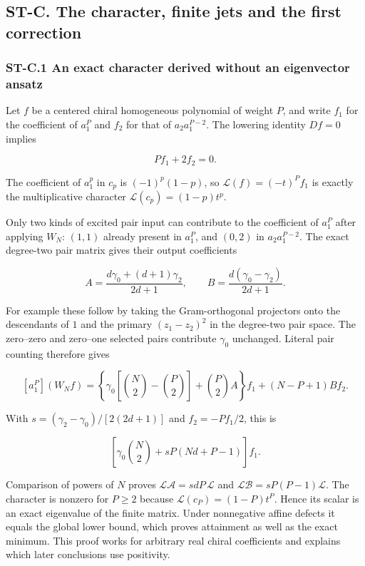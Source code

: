 \documentclass[a4paper,11pt]{article}
\numberwithin{equation}{section}
\begin{document}
\hypertarget{st-c.-the-character-finite-jets-and-the-first-correction}{%
\subsection{ST-C. The character, finite jets and the first correction}\label{st-c.-the-character-finite-jets-and-the-first-correction}}

\hypertarget{st-c.1-an-exact-character-derived-without-an-eigenvector-ansatz}{%
\subsubsection{ST-C.1 An exact character derived without an eigenvector ansatz}\label{st-c.1-an-exact-character-derived-without-an-eigenvector-ansatz}}

Let \(f\) be a centered chiral homogeneous polynomial of weight \(P\), and write \(f_1\) for the coefficient of \(a_1^P\) and \(f_2\) for that of \(a_2a_1^{P-2}\). The lowering identity \(Df=0\) implies

\[
Pf_1+2f_2=0.
\]

The coefficient of \(a_1^p\) in \(c_p\) is \((-1)^p(1-p)\), so \(\mathcal L(f)=(-t)^P f_1\) is exactly the multiplicative character \(\mathcal L(c_p)=(1-p)t^p\).

Only two kinds of excited pair input can contribute to the coefficient of \(a_1^P\) after applying \(W_N\): \((1,1)\) already present in \(a_1^P\), and \((0,2)\) in \(a_2a_1^{P-2}\). The exact degree-two pair matrix gives their output coefficients

\[
A=\frac{d\gamma_0+(d+1)\gamma_2}{2d+1},
\qquad B=\frac{d(\gamma_0-\gamma_2)}{2d+1}.
\]

For example these follow by taking the Gram-orthogonal projectors onto the descendants of \(1\) and the primary \((z_1-z_2)^2\) in the degree-two pair space. The zero--zero and zero--one selected pairs contribute \(\gamma_0\) unchanged. Literal pair counting therefore gives

\[
[a_1^P](W_N f)=
\left\{\gamma_0\left[\binom N2-\binom P2\right]
+\binom P2 A\right\}f_1
+(N-P+1)Bf_2.
\]

With \(s=(\gamma_2-\gamma_0)/[2(2d+1)]\) and \(f_2=-Pf_1/2\), this is

\[
\left[\gamma_0\binom N2+sP(Nd+P-1)\right]f_1.
\]

Comparison of powers of \(N\) proves \(\mathcal L\mathscr A=sdP\,\mathcal L\) and \(\mathcal L\mathscr B=sP(P-1)\mathcal L\). The character is nonzero for \(P\geq2\) because \(\mathcal L(c_P)=(1-P)t^P\). Hence its scalar is an exact eigenvalue of the finite matrix. Under nonnegative affine defects it equals the global lower bound, which proves attainment as well as the exact minimum. This proof works for arbitrary real chiral coefficients and explains which later conclusions use positivity.
\end{document}
